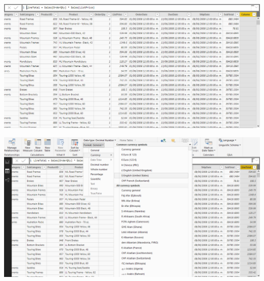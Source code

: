 	\begin{center}
	\includegraphics[width=15cm]{./images/power10}
	\end{center}	

	\begin{center}
	\includegraphics[width=15cm]{./images/power11}
	\end{center}	

